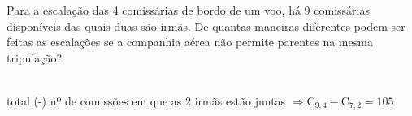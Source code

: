 \begin{ex}
 Para a escalação das 4 comissárias de bordo de um voo, há 9 comissárias disponíveis das quais duas são irmãs. De quantas maneiras diferentes podem ser feitas as escalações se a companhia aérea não permite parentes na mesma tripulação?
   \begin{sol}
    \phantom{A}\\
    total (-) nº de comissões em que as 2 irmãs estão juntas $\Longrightarrow \mathrm{C}_{9,4}-\mathrm{C}_{7,2}=105$ 
   \end{sol}
\end{ex}